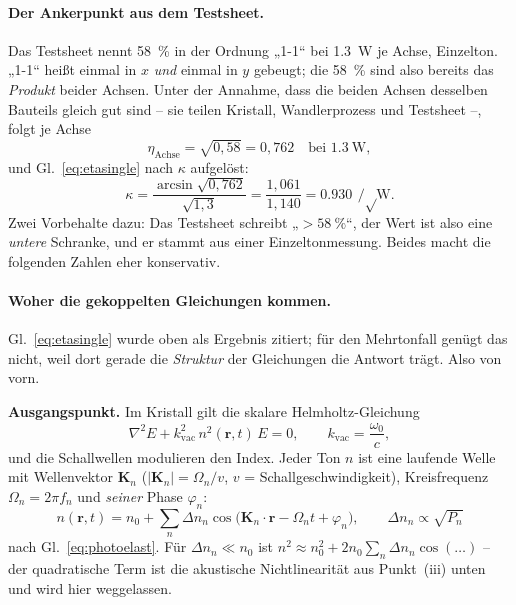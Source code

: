 \documentclass[11pt,a4paper]{article}
\begin{document}
\paragraph{Der Ankerpunkt aus dem Testsheet.}
Das Testsheet nennt \SI{58}{\percent} in der Ordnung „1-1`` bei
\SI{1.3}{\watt} je Achse, Einzelton. „1-1`` heißt einmal in $x$ \emph{und}
einmal in $y$ gebeugt; die \SI{58}{\percent} sind also bereits das
\emph{Produkt} beider Achsen. Unter der Annahme, dass die beiden Achsen
desselben Bauteils gleich gut sind -- sie teilen Kristall, Wandlerprozess und
Testsheet --, folgt je Achse
\begin{equation}
  \eta_\mathrm{Achse} = \sqrt{0{,}58} = 0{,}762 \quad\text{bei } \SI{1.3}{\watt},
\end{equation}
und Gl.~\eqref{eq:etasingle} nach $\kappa$ aufgelöst:
\begin{equation}
  \kappa = \frac{\arcsin\sqrt{0{,}762}}{\sqrt{1{,}3}}
         = \frac{1{,}061}{1{,}140} = \SI{0.930}{\per\sqrt\watt}.
  \label{eq:kappa}
\end{equation}
Zwei Vorbehalte dazu: Das Testsheet schreibt „$>\SI{58}{\percent}$``, der
Wert ist also eine \emph{untere} Schranke, und er stammt aus einer
Einzeltonmessung. Beides macht die folgenden Zahlen eher konservativ.

\paragraph{Woher die gekoppelten Gleichungen kommen.}
Gl.~\eqref{eq:etasingle} wurde oben als Ergebnis zitiert; für den
Mehrtonfall genügt das nicht, weil dort gerade die \emph{Struktur} der
Gleichungen die Antwort trägt. Also von vorn.

\medskip
\noindent\textbf{Ausgangspunkt.} Im Kristall gilt die skalare
Helmholtz-Gleichung
\begin{equation}
  \nabla^2 E + k_\mathrm{vac}^2\,n^2(\mathbf{r},t)\,E = 0 ,
  \qquad k_\mathrm{vac} = \frac{\omega_0}{c} ,
\end{equation}
und die Schallwellen modulieren den Index. Jeder Ton $n$ ist eine laufende
Welle mit Wellenvektor $\mathbf{K}_n$ ($|\mathbf{K}_n| = \Omega_n/v$,
$v$ = Schallgeschwindigkeit), Kreisfrequenz $\Omega_n = 2\pi f_n$ und
\emph{seiner} Phase $\varphi_n$:
\begin{equation}
  n(\mathbf{r},t) = n_0 + \sum_n \Delta n_n
    \cos\!\bigl(\mathbf{K}_n\!\cdot\!\mathbf{r} - \Omega_n t + \varphi_n\bigr),
  \qquad \Delta n_n \propto \sqrt{P_n}
\end{equation}
nach Gl.~\eqref{eq:photoelast}. Für $\Delta n_n\ll n_0$ ist
$n^2 \approx n_0^2 + 2n_0\sum_n\Delta n_n\cos(\dots)$ -- der quadratische
Term ist die akustische Nichtlinearität aus Punkt~(iii) unten und wird hier
weggelassen.
\end{document}
